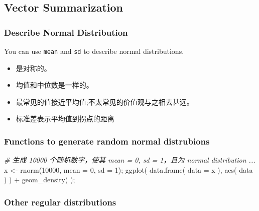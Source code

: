 \documentclass[
]{article}
\newenvironment{Shaded}{}{}
\newcommand{\AttributeTok}[1]{\textcolor[rgb]{0.49,0.56,0.16}{#1}}
\newcommand{\CommentTok}[1]{\textcolor[rgb]{0.38,0.63,0.69}{\textit{#1}}}
\newcommand{\DecValTok}[1]{\textcolor[rgb]{0.25,0.63,0.44}{#1}}
\newcommand{\FunctionTok}[1]{\textcolor[rgb]{0.02,0.16,0.49}{#1}}
\newcommand{\NormalTok}[1]{#1}
\newcommand{\OtherTok}[1]{\textcolor[rgb]{0.00,0.44,0.13}{#1}}
\newcommand{\SpecialCharTok}[1]{\textcolor[rgb]{0.25,0.44,0.63}{#1}}
\begin{document}
\hypertarget{vector-summarization}{%
\subsection{Vector Summarization}\label{vector-summarization}}

\hypertarget{describe-normal-distribution}{%
\subsubsection{Describe Normal
Distribution}\label{describe-normal-distribution}}

You can use \texttt{mean} and \texttt{sd} to describe normal
distributions.

\begin{itemize}
\item
  是对称的。
\item
  均值和中位数是一样的。
\item
  最常见的值接近平均值;不太常见的价值观与之相去甚远。
\item
  标准差表示平均值到拐点的距离
\end{itemize}

\hypertarget{functions-to-generate-random-normal-distrubions}{%
\subsubsection{Functions to generate random normal
distrubions}\label{functions-to-generate-random-normal-distrubions}}

\begin{Shaded}
\begin{Highlighting}[]
\CommentTok{\# 生成 10000 个随机数字，使其 mean = 0, sd = 1，且为 normal distribution ...}
\NormalTok{x }\OtherTok{\textless{}{-}} \FunctionTok{rnorm}\NormalTok{(}\DecValTok{10000}\NormalTok{, }\AttributeTok{mean =} \DecValTok{0}\NormalTok{, }\AttributeTok{sd =} \DecValTok{1}\NormalTok{);}
\FunctionTok{ggplot}\NormalTok{( }\FunctionTok{data.frame}\NormalTok{( }\AttributeTok{data =}\NormalTok{ x ), }\FunctionTok{aes}\NormalTok{( data ) ) }\SpecialCharTok{+} \FunctionTok{geom\_density}\NormalTok{(  );}
\end{Highlighting}
\end{Shaded}

\hypertarget{other-regular-distributions}{%
\subsubsection{Other regular
distributions}\label{other-regular-distributions}}
\end{document}
